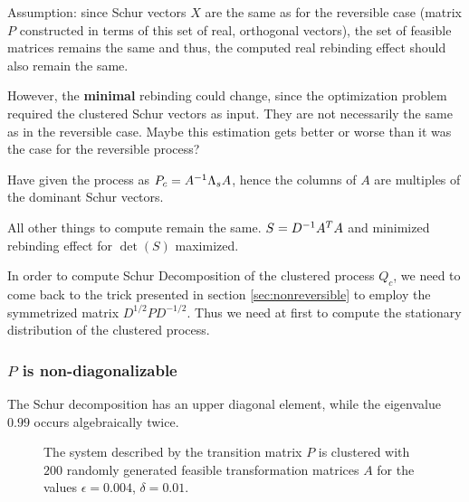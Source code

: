 Assumption: since Schur vectors $X$ are the same as for the reversible case (matrix $P$ constructed in terms of this set of real, orthogonal vectors), the set of feasible matrices remains the same and thus, the computed real rebinding effect should also remain the same.

However, the \textbf{minimal} rebinding could change, since the optimization problem required the clustered Schur vectors as input. They are not necessarily the same as in the reversible case.
Maybe this estimation gets better or worse than it was the case for the reversible process?

Have given the process as $P_c = A^{-1} \Lambda_s A$, hence the columns of $A$ are multiples of the dominant Schur vectors.

All other things to compute remain the same. $S = D^{-1} A^T A$ and minimized rebinding effect for $\det(S)$ maximized.

In order to compute Schur Decomposition of the clustered process $Q_c$, we need to come back to the trick presented in section \ref{sec:nonreversible} to employ the symmetrized matrix $D^{1/2} P D^{-1/2}$. Thus we need at first to compute the stationary distribution of the clustered process.


\subsubsection*{$P$ is non-diagonalizable}

The Schur decomposition has an upper diagonal element, while the eigenvalue $0.99$ occurs algebraically twice.
\begin{figure}[h]
	\centering
	\hspace{1pt}
	\hspace{1pt}
	\caption{The system described by the transition matrix $P$ is clustered with $200$ randomly generated feasible transformation matrices $A$ for the values $\epsilon = 0.004$, $\delta = 0.01$.} %
\end{figure}

